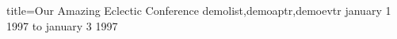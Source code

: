 \documentclass[a4paper]{article}
\begin{document}
\margins{1.5cm}
\begin{timetable}
 {title=Our Amazing Eclectic Conference}
 {demolist,demoaptr,demoevtr}
 january 1 1997 to january 3 1997
\end{timetable}
\end{document}

